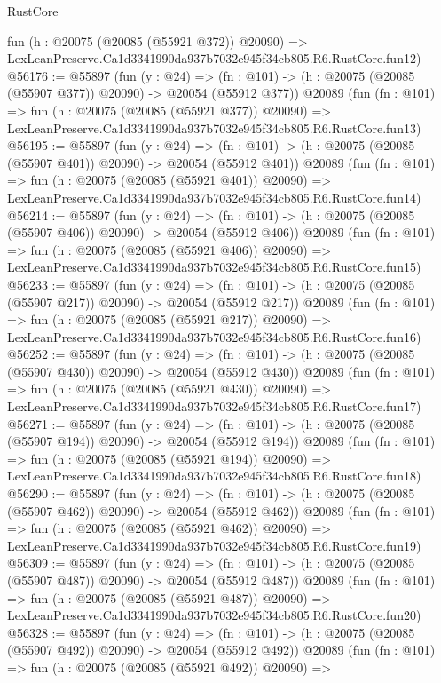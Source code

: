 \begin{lexlean}{RustCore}
\begin{coremodule}
    fun (h : @20075 (@20085 (@55921 @372)) @20090) =>
    LexLeanPreserve.Ca1d3341990da937b7032e945f34cb805.R6.RustCore.fun12)
@56176 := @55897
    (fun (y : @24) =>
    (fn : @101) -> (h : @20075 (@20085 (@55907 @377)) @20090) -> @20054 (@55912 @377))
    @20089
    (fun (fn : @101) =>
    fun (h : @20075 (@20085 (@55921 @377)) @20090) =>
    LexLeanPreserve.Ca1d3341990da937b7032e945f34cb805.R6.RustCore.fun13)
@56195 := @55897
    (fun (y : @24) =>
    (fn : @101) -> (h : @20075 (@20085 (@55907 @401)) @20090) -> @20054 (@55912 @401))
    @20089
    (fun (fn : @101) =>
    fun (h : @20075 (@20085 (@55921 @401)) @20090) =>
    LexLeanPreserve.Ca1d3341990da937b7032e945f34cb805.R6.RustCore.fun14)
@56214 := @55897
    (fun (y : @24) =>
    (fn : @101) -> (h : @20075 (@20085 (@55907 @406)) @20090) -> @20054 (@55912 @406))
    @20089
    (fun (fn : @101) =>
    fun (h : @20075 (@20085 (@55921 @406)) @20090) =>
    LexLeanPreserve.Ca1d3341990da937b7032e945f34cb805.R6.RustCore.fun15)
@56233 := @55897
    (fun (y : @24) =>
    (fn : @101) -> (h : @20075 (@20085 (@55907 @217)) @20090) -> @20054 (@55912 @217))
    @20089
    (fun (fn : @101) =>
    fun (h : @20075 (@20085 (@55921 @217)) @20090) =>
    LexLeanPreserve.Ca1d3341990da937b7032e945f34cb805.R6.RustCore.fun16)
@56252 := @55897
    (fun (y : @24) =>
    (fn : @101) -> (h : @20075 (@20085 (@55907 @430)) @20090) -> @20054 (@55912 @430))
    @20089
    (fun (fn : @101) =>
    fun (h : @20075 (@20085 (@55921 @430)) @20090) =>
    LexLeanPreserve.Ca1d3341990da937b7032e945f34cb805.R6.RustCore.fun17)
@56271 := @55897
    (fun (y : @24) =>
    (fn : @101) -> (h : @20075 (@20085 (@55907 @194)) @20090) -> @20054 (@55912 @194))
    @20089
    (fun (fn : @101) =>
    fun (h : @20075 (@20085 (@55921 @194)) @20090) =>
    LexLeanPreserve.Ca1d3341990da937b7032e945f34cb805.R6.RustCore.fun18)
@56290 := @55897
    (fun (y : @24) =>
    (fn : @101) -> (h : @20075 (@20085 (@55907 @462)) @20090) -> @20054 (@55912 @462))
    @20089
    (fun (fn : @101) =>
    fun (h : @20075 (@20085 (@55921 @462)) @20090) =>
    LexLeanPreserve.Ca1d3341990da937b7032e945f34cb805.R6.RustCore.fun19)
@56309 := @55897
    (fun (y : @24) =>
    (fn : @101) -> (h : @20075 (@20085 (@55907 @487)) @20090) -> @20054 (@55912 @487))
    @20089
    (fun (fn : @101) =>
    fun (h : @20075 (@20085 (@55921 @487)) @20090) =>
    LexLeanPreserve.Ca1d3341990da937b7032e945f34cb805.R6.RustCore.fun20)
@56328 := @55897
    (fun (y : @24) =>
    (fn : @101) -> (h : @20075 (@20085 (@55907 @492)) @20090) -> @20054 (@55912 @492))
    @20089
    (fun (fn : @101) =>
    fun (h : @20075 (@20085 (@55921 @492)) @20090) =>

\end{coremodule}
\end{lexlean}

